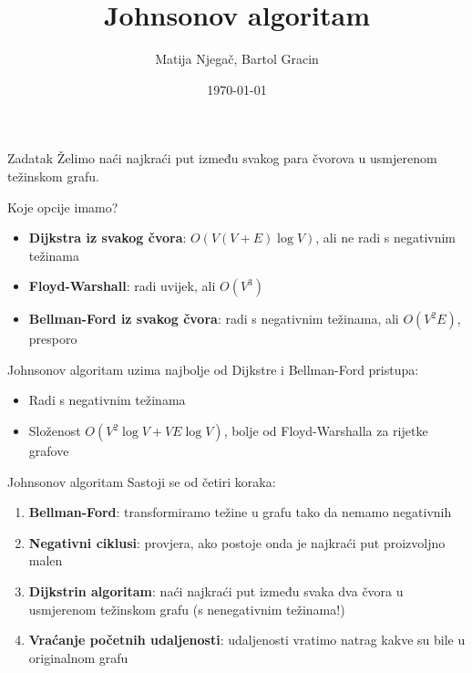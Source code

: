 \documentclass{beamer}
\title{Johnsonov algoritam}
\author{Matija Njegač, Bartol Gracin}
\date{\today}
\institute{Prirodoslovno - matematički fakultet, Sveučilište u Zagrebu}
\begin{document}
\begin{frame}
    \titlepage
\end{frame}


\begin{frame}{Zadatak}
  Želimo naći najkraći put između svakog para čvorova u
  usmjerenom težinskom grafu.

  \vspace{1em}
  Koje opcije imamo?
  \begin{itemize}
    \item \textbf{Dijkstra iz svakog čvora}: $O(V(V + E) \log V)$,
      ali ne radi s negativnim težinama
    \item \textbf{Floyd-Warshall}: radi uvijek, ali $O(V^3)$
    \item \textbf{Bellman-Ford iz svakog čvora}: radi s negativnim težinama,
      ali $O(V^2 E)$, presporo
  \end{itemize}

  \vspace{1em}
  Johnsonov algoritam uzima najbolje od Dijkstre i Bellman-Ford pristupa:
  \begin{itemize}
    \item Radi s negativnim težinama
    \item Složenost $O(V^2 \log V + VE\log V)$, bolje od Floyd-Warshalla za rijetke grafove
  \end{itemize}
\end{frame}


\begin{frame}{Johnsonov algoritam}
  Sastoji se od četiri koraka:

  \begin{enumerate}
    \item \textbf{Bellman-Ford}: transformiramo težine u grafu tako da nemamo negativnih
    \item \textbf{Negativni ciklusi}: provjera, ako postoje onda je najkraći put proizvoljno malen
    \item \textbf{Dijkstrin algoritam}: naći najkraći put između svaka dva čvora u usmjerenom težinskom grafu (s nenegativnim težinama!)
    \item \textbf{Vraćanje početnih udaljenosti}: udaljenosti vratimo natrag kakve su bile u originalnom grafu
  \end{enumerate}
\end{frame}
\end{document}
